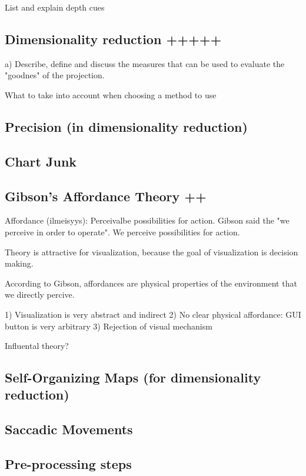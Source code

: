 \documentclass[a4paper]{article}
\begin{document}
List and explain depth cues

\subsection{Dimensionality reduction +++++}

a) Describe, define and discuss the measures that can be used to evaluate the "goodnes" of the projection.

What to take into account when choosing a method to use

\subsection{Precision (in dimensionality reduction)}

\subsection{Chart Junk}

\subsection{Gibson's Affordance Theory ++}

Affordance (ilmeisyys): Perceivalbe possibilities for action. Gibson said the "we perceive in order to operate". We perceive possibilities for action. 

Theory is attractive for visualization, because the goal of visualization is decision making. 

According to Gibson, affordances are physical properties of the environment that we directly percive.

1) Visualization is very abstract and indirect
2) No clear physical affordance: GUI button is very arbitrary
3) Rejection of visual mechanism

Influental theory?

\subsection{Self-Organizing Maps (for dimensionality reduction)}

\subsection{Saccadic Movements}

\subsection{Pre-processing steps}
\end{document}
